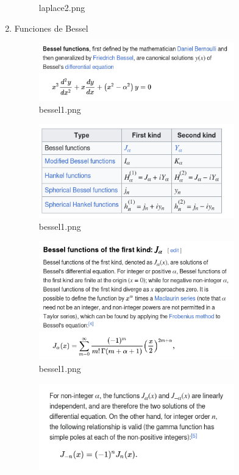 \documentclass[12pt]{exam}
\begin{document}
\begin{enumerate}
\begin{figure}[H]
      \caption{laplace2.png}
      \label{fig:laplace2-png}
    \end{figure}
  \item Funciones de Bessel
    \begin{figure}[H]
      \centering
      \includegraphics[width=0.8\textwidth]{bessel1.png}
      \caption{bessel1.png}
      \label{fig:bessel1-png}
    \end{figure}
    \begin{figure}[H]
      \centering
      \includegraphics[width=0.8\textwidth]{bessel2.png}
      \caption{bessel1.png}
      \label{fig:bessel2-png}
    \end{figure}
    \begin{figure}[H]
      \centering
      \includegraphics[width=0.8\textwidth]{bessel3.png}
      \caption{bessel1.png}
      \label{fig:bessel3-png}
    \end{figure}
    \begin{figure}[H]
      \centering
      \includegraphics[width=0.8\textwidth]{bessel4.png}

\end{figure}
\end{enumerate}
\end{document}
